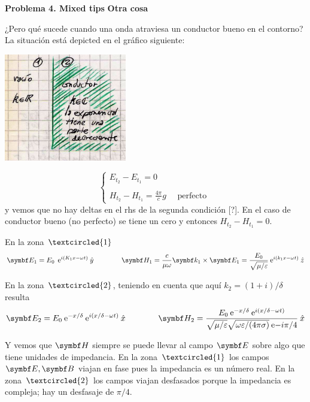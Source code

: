 \documentclass[10pt,oneside]{CBFT_book}
\begin{document}
\begin{ejemplo}{\bf Problema 4. Mixed tips}
{\bf Otra cosa}

¿Pero qué sucede cuando una onda atraviesa un conductor bueno en el contorno?
La situación está depicted en el gráfico siguiente:

\includegraphics[width=0.40\textwidth]{images/fig_ft1_problema4B.jpg} 

\[
	\begin{cases}
	 E_{t_2} - E_{t_1} = 0 \\
	 \\
	 H_{t_2} - H_{t_1} = \frac{4 \pi}{c} g \quad \text{ perfecto }
	\end{cases}
\]
y vemos que no hay deltas en el rhs de la segunda condición [?]. En el caso de conductor bueno
(no perfecto) se tiene un cero y entonces $  H_{t_2} - H_{t_1} = 0 $.

En la zona $\textcircled{1}$
\[
	\vb{E}_1 = E_0 \: \euler^{i (K_1x - \omega t)} \yver  \qquad \qquad 
	\vb{H}_1 = \frac{c}{\mu \omega} \pv{k_1}{E_1} = \frac{E_0}{\sqrt{\mu/\varepsilon}} 
	\euler^{i (k_1x - \omega t)} \zver
\]

En la zona $\textcircled{2}$, teniendo en cuenta que aquí $k_2 = (1 + i) / \delta$ resulta
\[
	\vb{E}_2 = E_0 \euler^{-x/\delta} \euler^{i (x/\delta - \omega t)} \xver
	\qquad \qquad 
	\vb{H}_2 = \frac{E_0 \euler^{-x/\delta} \euler^{i (x/\delta - \omega t)} }
	{ \sqrt{\mu/\varepsilon} \sqrt{\omega\varepsilon/(4\pi\sigma)} \euler{-i\pi/4} }\xver
\]

Y vemos que $\vb{H}$ siempre se puede llevar al campo $\vb{E}$ sobre algo que tiene unidades
de impedancia.
En la zona $\textcircled{1}$ los campos $\vb{E}, \vb{B}$ viajan en fase pues la impedancia es un
número real. En la zona $\textcircled{2}$ los campos viajan desfasados porque la impedancia es
compleja; hay un desfasaje de $\pi/4$.
 
\end{ejemplo}
\end{document}
